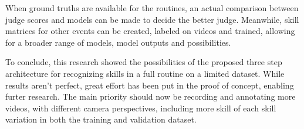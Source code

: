 When ground truths are available for the routines, an actual comparison between judge scores and models can be made to decide the better judge. Meanwhile, skill matrices for other events can be created, labeled on videos and trained, allowing for a broader range of models, model outputs and possibilities.

To conclude, this research showed the possibilities of the proposed three step architecture for recognizing skills in a full routine on a limited dataset. While results aren't perfect, great effort has been put in the proof of concept, enabling furter research. The main priority should now be recording and annotating more videos, with different camera perspectives, including more skill of each skill variation in both the training and validation dataset. 
